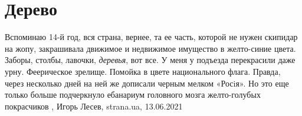  
 
 
 
 
\chapter{Дерево}
\label{sec:slova.derevo}

Вспоминаю 14-й год, вся страна, вернее, та ее часть, которой не нужен скипидар
на жопу, закрашивала движимое и недвижимое имущество в желто-синие цвета.
Заборы, столбы, лавочки, \emph{деревья}, вот все. У меня у подъезда перекрасили даже
урну. Феерическое зрелище. Помойка в цвете национального флага. Правда, через
несколько дней на ней же дописали черным мелком «Росiя». Но это еще только
больше подчеркнуло ебанариум головного мозга желто-голубых покрасчиков
, 
Игорь Лесев, strana.ua, 13.06.2021

